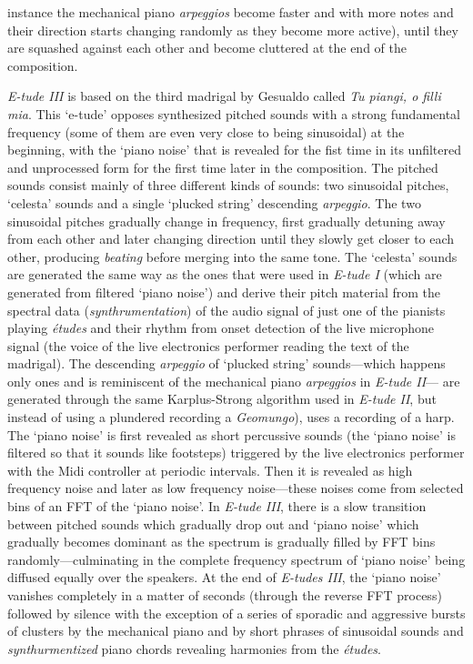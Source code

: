 instance the mechanical piano \emph{arpeggios} become faster and with more notes and their direction starts changing randomly as they become more active), until they are squashed against each other and become cluttered at the end of the composition.

\emph{E-tude III} is based on the third madrigal by Gesualdo called \emph{Tu piangi, o filli mia}. This `e-tude' opposes synthesized pitched sounds with a strong fundamental frequency (some of them are even very close to being sinusoidal) at the beginning, with the `piano noise' that is revealed for the fist time in its unfiltered and unprocessed form for the first time later in the composition. The pitched sounds consist mainly of three different kinds of sounds: two sinusoidal pitches, `celesta' sounds and a single `plucked string' descending \emph{arpeggio}. The two sinusoidal pitches gradually change in frequency, first gradually detuning away from each other and later changing direction until they slowly get closer to each other, producing \emph{beating} before merging into the same tone. The `celesta' sounds are generated the same way as the ones that were used in \emph{E-tude I} (which are generated from filtered `piano noise') and derive their pitch material from the spectral data (\emph{synthrumentation}) of the audio signal of just one of the pianists playing \emph{\'{e}tudes} and their rhythm from onset detection of the live microphone signal (the voice of the live electronics performer reading the text of the madrigal). The descending \emph{arpeggio} of `plucked string' sounds---which happens only ones and is reminiscent of the mechanical piano \emph{arpeggios} in \emph{E-tude II}--- are generated through the same Karplus-Strong algorithm used in \emph{E-tude II}, but instead of using a plundered recording a \emph{Geomungo}), uses a recording of a harp. The `piano noise' is first revealed as short percussive sounds (the `piano noise' is filtered so that it sounds like footsteps) triggered by the live electronics performer with the Midi controller at periodic intervals. Then it is revealed as high frequency noise and later as low frequency noise---these noises come from selected bins of an FFT of the `piano noise'. In \emph{E-tude III}, there is a slow transition between pitched sounds which gradually drop out and `piano noise' which gradually becomes dominant as the spectrum is gradually filled by FFT bins randomly---culminating in the complete frequency spectrum of `piano noise' being diffused equally over the speakers. At the end of \emph{E-tudes III}, the `piano noise' vanishes completely in a matter of seconds (through the reverse FFT process) followed by silence with the exception of a series of sporadic and aggressive bursts of clusters by the mechanical piano and by short phrases of sinusoidal sounds and \emph{synthurmentized} piano chords revealing harmonies from the \emph{\'{e}tudes}. 

